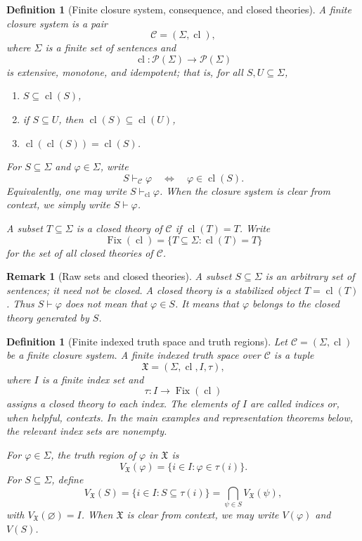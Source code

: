 \documentclass[10pt,a4paper]{amsart}
\numberwithin{equation}{section}
\newtheorem{definition}[theorem]{Definition}
\newtheorem{remark}[theorem]{Remark}
\newcommand{\Pow}{\mathcal P}
\newcommand{\Cl}{\operatorname{cl}}
\newcommand{\Fix}{\operatorname{Fix}}
\newcommand{\C}{\mathcal C}
\newcommand{\X}{\mathfrak X}
\newcommand{\Sig}{\Sigma}
\begin{document}
\begin{definition}[Finite closure system, consequence, and closed theories]
A \emph{finite closure system} is a pair
\[
  \C=(\Sig,\Cl),
\]
where \(\Sig\) is a finite set of sentences and
\[
  \Cl:\Pow(\Sig)\to\Pow(\Sig)
\]
is extensive, monotone, and idempotent; that is, for all \(S,U\subseteq\Sig\),
\begin{enumerate}[label=(\roman*)]
  \item \(S\subseteq\Cl(S)\),
  \item if \(S\subseteq U\), then \(\Cl(S)\subseteq\Cl(U)\),
  \item \(\Cl(\Cl(S))=\Cl(S)\).
\end{enumerate}
For \(S\subseteq\Sig\) and \(\varphi\in\Sig\), write
\[
  S\vdash_{\C}\varphi
  \quad\Longleftrightarrow\quad
  \varphi\in\Cl(S).
\]
Equivalently, one may write \(S\vdash_{\Cl}\varphi\).  When the closure system is clear from context, we simply write \(S\vdash\varphi\).

A subset \(T\subseteq\Sig\) is a \emph{closed theory} of \(\C\) if \(\Cl(T)=T\).  Write
\[
  \Fix(\Cl)=\{T\subseteq\Sig: \Cl(T)=T\}
\]
for the set of all closed theories of \(\C\).
\end{definition}

\begin{remark}[Raw sets and closed theories]
A subset \(S\subseteq\Sig\) is an arbitrary set of sentences; it need not be closed. A closed theory is a stabilized object \(T=\Cl(T)\). Thus \(S\vdash\varphi\) does not mean that \(\varphi\in S\). It means that \(\varphi\) belongs to the closed theory generated by \(S\).
\end{remark}

\begin{definition}[Finite indexed truth space and truth regions]
Let \(\C=(\Sig,\Cl)\) be a finite closure system. A \emph{finite indexed truth space} over \(\C\) is a tuple
\[
  \X=(\Sig,\Cl,I,\tau),
\]
where \(I\) is a finite index set and
\[
  \tau:I\to\Fix(\Cl)
\]
assigns a closed theory to each index.  The elements of \(I\) are called \emph{indices} or, when helpful, \emph{contexts}. In the main examples and representation theorems below, the relevant index sets are nonempty.

For \(\varphi\in\Sig\), the \emph{truth region} of \(\varphi\) in \(\X\) is
\[
  V_{\X}(\varphi)=\{i\in I:\varphi\in\tau(i)\}.
\]
For \(S\subseteq\Sig\), define
\[
  V_{\X}(S)=\{i\in I:S\subseteq\tau(i)\}
  =\bigcap_{\psi\in S}V_{\X}(\psi),
\]
with \(V_{\X}(\varnothing)=I\).  When \(\X\) is clear from context, we may write \(V(\varphi)\) and \(V(S)\).
\end{definition}
\end{document}
